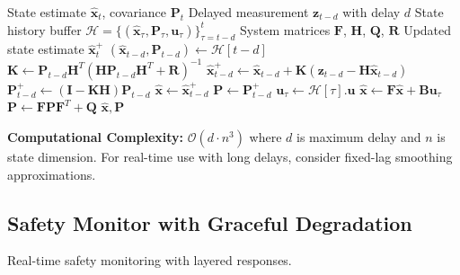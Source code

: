 \begin{algorithm}[H]
\caption{Kalman Filter with Delayed Measurements}
\label{alg:delayed_kf}
\begin{algorithmic}[1]
\REQUIRE State estimate $\hat{\mathbf{x}}_{t}$, covariance $\mathbf{P}_t$
\REQUIRE Delayed measurement $\mathbf{z}_{t-d}$ with delay $d$
\REQUIRE State history buffer $\mathcal{H} = \{(\hat{\mathbf{x}}_\tau, \mathbf{P}_\tau, \mathbf{u}_\tau)\}_{\tau=t-d}^{t}$
\REQUIRE System matrices $\mathbf{F}$, $\mathbf{H}$, $\mathbf{Q}$, $\mathbf{R}$
\ENSURE Updated state estimate $\hat{\mathbf{x}}_{t}^+$
\STATE {}
\STATE $(\hat{\mathbf{x}}_{t-d}, \mathbf{P}_{t-d}) \gets \mathcal{H}[t-d]$
\STATE $\mathbf{K} \gets \mathbf{P}_{t-d} \mathbf{H}^T (\mathbf{H} \mathbf{P}_{t-d} \mathbf{H}^T + \mathbf{R})^{-1}$
\STATE $\hat{\mathbf{x}}_{t-d}^+ \gets \hat{\mathbf{x}}_{t-d} + \mathbf{K}(\mathbf{z}_{t-d} - \mathbf{H}\hat{\mathbf{x}}_{t-d})$
\STATE $\mathbf{P}_{t-d}^+ \gets (\mathbf{I} - \mathbf{K}\mathbf{H})\mathbf{P}_{t-d}$
\STATE
\STATE {}
\STATE $\hat{\mathbf{x}} \gets \hat{\mathbf{x}}_{t-d}^+$
\STATE $\mathbf{P} \gets \mathbf{P}_{t-d}^+$
    \STATE $\mathbf{u}_\tau \gets \mathcal{H}[\tau].\mathbf{u}$
    \STATE $\hat{\mathbf{x}} \gets \mathbf{F}\hat{\mathbf{x}} + \mathbf{B}\mathbf{u}_\tau$ 
    \STATE $\mathbf{P} \gets \mathbf{F}\mathbf{P}\mathbf{F}^T + \mathbf{Q}$
\ENDFOR
\RETURN $\hat{\mathbf{x}}, \mathbf{P}$
\end{algorithmic}
\end{algorithm}

\textbf{Computational Complexity:} $\mathcal{O}(d \cdot n^3)$ where $d$ is maximum delay and $n$ is state dimension. For real-time use with long delays, consider fixed-lag smoothing approximations.

\subsection{Safety Monitor with Graceful Degradation}

Real-time safety monitoring with layered responses.

